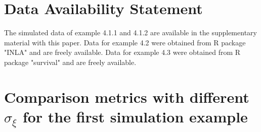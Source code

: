 \documentclass[ba]{imsart}
\begin{document}
\section*{Data Availability Statement}
The simulated data of example 4.1.1 and 4.1.2 are available in the supplementary material with this paper. Data for example 4.2 were obtained from R package "INLA" \citep{inla} and are freely available.
Data for example 4.3 were obtained from R package "survival" \citep{survival-package} and are freely available. 


\appendix

\section{Comparison metrics with different $\sigma_\xi$ for the first simulation example}

\begin{table}[h]
  \begin{center}
  \end{center}
  \caption{Comparison metrics in terms of MSE and posterior coverage rate from 500 independent replications when $\sigma_\xi = 1.3$, for the 60 frailty effects and the fixed effect in the first simulation study in section \ref{subsubsec:sim1}.}
  \label{table:Sim1Agg1}
  \end{table}
\end{document}
